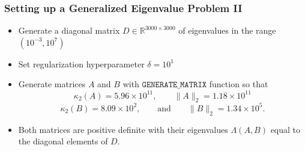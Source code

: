 \documentclass[landscape]{beamer}
\newcommand{\eqand}{\qquad\mbox{and}\qquad}
\newcommand{\comm}[1]{\added[comment={#1}]{}}
\begin{document}
\begin{frame}
  \frametitle{Setting up a Generalized Eigenvalue Problem II\comm{I think it is important to include the subranges.  The ones that are farther away are lead to a lot of nonconverged Ritz pairs in the graphs, so you might want to point that out.}}
  \begin{itemize}
  \item Generate a diagonal matrix $D \in \mathbb{R}^{3000 \times 3000}$ of eigenvalues in the range $(10^{-3}, 10^7)$
  \item Set regularization hyperparameter $\delta = 10^1$
  \item Generate matrices $A$ and $B$ with $\texttt{GENERATE\_MATRIX}$ function so that 
    \begin{equation*}
      \kappa_2(A) = 5.96\times 10^{11}, \qquad \|A\|_2 = 1.18\times 10^{11}
    \end{equation*}
    \begin{equation*}
      \kappa_2(B) = 8.09\times 10^{2}, \eqand \|B\|_2 = 1.34 \times 10^{5}.
    \end{equation*}\comm{What is the condition of $A-\sigma B$?  That is more important than any of the other condition numbers.}
   \item Both matrices are positive definite with their eigenvalues $\Lambda(A, B)$ equal to the diagonal elements of $D$.
  \end{itemize}
\end{frame}
\end{document}
